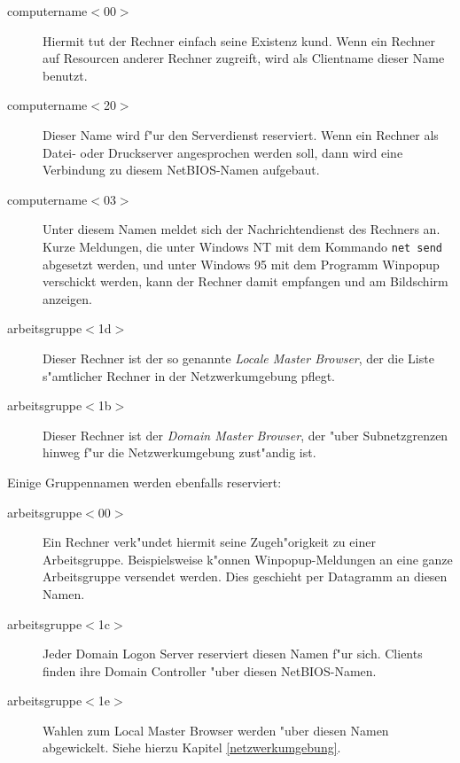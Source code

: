 \documentclass{scrartcl}\usepackage{pslatex}\typearea{12}
\newcommand{\prog}{\texttt}
\newcommand{\defin}{\emph}
\begin{document}
\begin{description}

\item[computername$<$00$>$] Hiermit tut der Rechner einfach seine
Existenz kund. Wenn ein Rechner auf Resourcen anderer Rechner zugreift,
wird als Clientname dieser Name benutzt.

\item[computername$<$20$>$] Dieser Name wird f"ur den Serverdienst
reserviert. Wenn ein Rechner als Datei- oder Druckserver angesprochen
werden soll, dann wird eine Verbindung zu diesem NetBIOS-Namen aufgebaut.

\item[computername$<$03$>$] Unter diesem Namen meldet sich der
Nachrichtendienst des Rechners an. Kurze Meldungen, die unter Windows
NT mit dem Kommando \prog{net send} abgesetzt werden, und unter
Windows 95 mit dem Programm Winpopup verschickt werden, kann der
Rechner damit empfangen und am Bildschirm anzeigen.

\item[arbeitsgruppe$<$1d$>$] Dieser Rechner ist der so genannte
  \defin{Locale Master Browser}, der die Liste s"amtlicher Rechner in
  der Netzwerkumgebung pflegt.
  
\item[arbeitsgruppe$<$1b$>$] Dieser Rechner ist der \defin{Domain
    Master Browser}, der "uber Subnetzgrenzen hinweg f"ur die
  Netzwerkumgebung zust"andig ist.

\end{description}

Einige Gruppennamen werden ebenfalls reserviert:

\begin{description}
  
\item[arbeitsgruppe$<$00$>$] Ein Rechner verk"undet hiermit seine
  Zugeh"origkeit zu einer Arbeitsgruppe. Beispielsweise k"onnen
  Winpopup-Meldungen an eine ganze Arbeitsgruppe versendet werden.
  Dies geschieht per Datagramm an diesen Namen.
  
\item[arbeitsgruppe$<$1c$>$] Jeder Domain Logon Server reserviert
  diesen Namen f"ur sich. Clients finden ihre Domain Controller "uber
  diesen NetBIOS-Namen.
  
\item[arbeitsgruppe$<$1e$>$] Wahlen zum Local Master Browser werden
  "uber diesen Namen abgewickelt. Siehe hierzu Kapitel
  \ref{netzwerkumgebung}.

\end{description}
\end{document}
